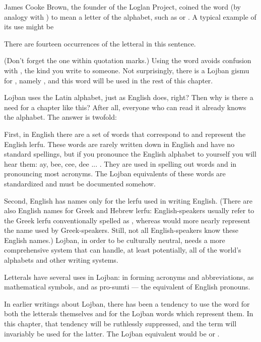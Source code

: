 James Cooke Brown, the founder of the Loglan Project, coined
    the word  (by analogy with ) to mean a
    letter of the alphabet, such as  or . A typical
    example of its use might be
\begin{example}
There are fourteen occurrences of the letteral\n
\T	{} in this sentence.
\end{example}

(Don't forget the one within quotation marks.) Using the word
     avoids confusion with , the kind you
    write to someone. Not surprisingly, there is a Lojban gismu for
    , namely , and this word will be used in
    the rest of this chapter. 

Lojban uses the Latin alphabet, just as English does, right?
    Then why is there a need for a chapter like this? After all,
    everyone who can read it already knows the alphabet. The answer
    is twofold:

First, in English there are a set of words that correspond
    to and represent the English lerfu. These words are rarely
    written down in English and have no standard spellings, but if
    you pronounce the English alphabet to yourself you will hear
    them: ay, bee, cee, dee ... . They are used in spelling out
    words and in pronouncing most acronyms. The Lojban equivalents
    of these words are standardized and must be documented
    somehow.

Second, English has names only for the lerfu used in writing
    English. (There are also English names for Greek and Hebrew
    lerfu: English-speakers usually refer to the Greek lerfu
    conventionally spelled  as , whereas 
    would more nearly represent the name used by Greek-speakers.
    Still, not all English-speakers know these English names.)
    Lojban, in order to be culturally neutral, needs a more
    comprehensive system that can handle, at least potentially, all
    of the world's alphabets and other writing systems.

Letterals have several uses in Lojban: in forming acronyms
    and abbreviations, as mathematical symbols, and as pro-sumti
    --- the equivalent of English pronouns.

In earlier writings about Lojban, there has been a tendency
    to use the word  for both the letterals themselves and
    for the Lojban words which represent them. In this chapter,
    that tendency will be ruthlessly suppressed, and the term
     will invariably be used for the latter. The
    Lojban equivalent would be  or .



